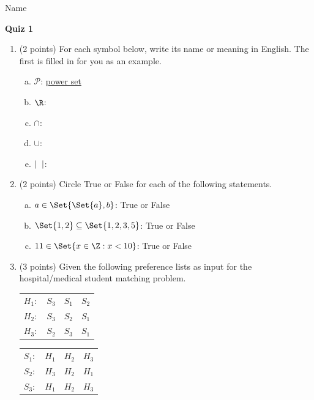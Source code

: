 \documentclass[11pt]{article}
\begin{document}
\noindent Name \underline{\hspace{12cm}}\\


\begin{center}
\LARGE\textbf{Quiz 1}%
\end{center}



\begin{enumerate}


\item (2 points) For each symbol below, write its name or meaning in English. The first is filled in for you as an example.


\begin{enumerate}[(a)]
    \item $\mathcal{P}$: \underline{power set}
    \item $\R$: \underline{\hspace{2in}}
    \item $\cap$: \underline{\hspace{2in}}
    \item $\cup$: \underline{\hspace{2in}}
    \item $|\hspace{2mm} |$: \underline{\hspace{2in}}
\end{enumerate}

\item (2 points) Circle True or False for each of the following statements.

\begin{enumerate}[(a)]
    \item $a \in \Set{\Set{a},b}$: True or False
    \item $\Set{1,2} \subseteq \Set{1,2,3,5}$: True or False
    \item $11 \in \Set{x \in \Z: x < 10}$: True or False
\end{enumerate}

\item (3 points) Given the following preference lists as input for the hospital/medical student matching problem.

\begin{center}
\begin{tabular}{ c c c c }
$H_1:$ & $S_3$ & $S_1$ & $S_2$ \\
$H_2:$ & $S_3$ & $S_2$ & $S_1$ \\
$H_3:$ & $S_2$ & $S_3$ & $S_1$
\end{tabular}
\qquad
\begin{tabular}{ c c c c }
$S_1:$ & $H_1$ & $H_2$ & $H_3$ \\
$S_2:$ & $H_3$ & $H_2$ & $H_1$ \\
$S_3:$ & $H_1$ & $H_2$ & $H_3$
\end{tabular}
\end{center}


\end{enumerate}
\end{document}
